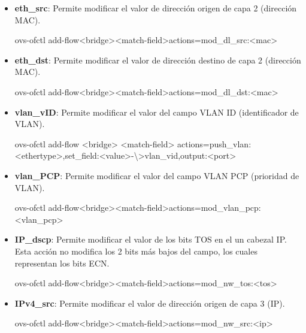 \begin{itemize}

\item \textbf{eth\_src}: Permite modificar el valor de direcci\'on origen de capa 2 (direcci\'on MAC).

\begin{center}
ovs-ofctl add-flow<bridge><match-field>actions=mod\_dl\_src:<mac>
\end{center}

\item \textbf{eth\_dst}: Permite modificar el valor de direcci\'on destino de capa 2 (direcci\'on MAC).

\begin{center}
ovs-ofctl add-flow<bridge><match-field>actions=mod\_dl\_dst:<mac>
\end{center}

\item \textbf{vlan\_vID}: Permite modificar el valor del campo VLAN ID (identificador de VLAN).
                         
\begin{center}
ovs-ofctl add-flow <bridge> <match-field> actions=push\_vlan:<ethertype>,set\_field:<value>-\textbackslash >vlan\_vid,output:<port>
\end{center}

\item \textbf{vlan\_PCP}: Permite modificar el valor del campo VLAN PCP (prioridad de VLAN).

\begin{center}
ovs-ofctl add-flow<bridge><match-field>actions=mod\_vlan\_pcp:<vlan\_pcp>
\end{center}

\item \textbf{IP\_dscp}: Permite modificar el valor de los bits TOS en el un cabezal IP. Esta acci\'on no modifica los 2 bits m\'as bajos del campo, los cuales representan los bits ECN.

\begin{center}
ovs-ofctl add-flow<bridge><match-field>actions=mod\_nw\_tos:<tos>
\end{center}

\item \textbf{IPv4\_src}: Permite modificar el valor de direcci\'on origen de capa 3 (IP).

\begin{center}
ovs-ofctl add-flow<bridge><match-field>actions=mod\_nw\_src:<ip>
\end{center}


\end{itemize}

